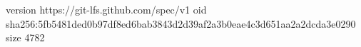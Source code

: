 version https://git-lfs.github.com/spec/v1
oid sha256:5fb5481ded0b97df8ed6bab3843d2d39af2a3b0eae4c3d651aa2a2dcda3e0290
size 4782
